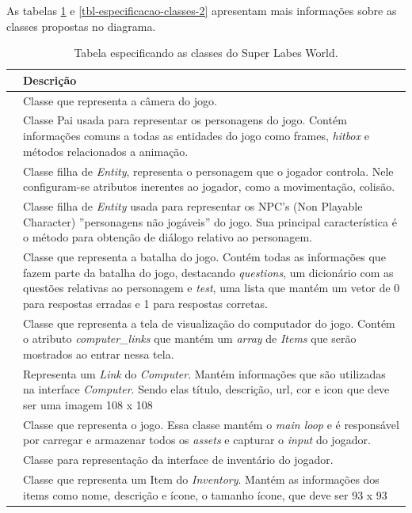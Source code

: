 As tabelas \ref{tbl-especificacao-classes-1} e \ref{tbl-especificacao-classes-2}  apresentam mais informações sobre as classes propostas no diagrama.

\begin{table}[h!]
	\caption{Tabela especificando as classes do Super Labes World.}
	\label{tbl-especificacao-classes-1}
	\centering
	\renewcommand{\arraystretch}{2}
	\begin{small}
		\begin{tabular}{ | p{35mm} | p{100mm} |}\hline \rowcolor{MidnightBlue}
			\centering{\textbf{Classe}} & \textbf{Descrição}  \\\hline		
			\centering{\textit{AllSprites}} & Classe que representa a câmera do jogo. \\\hline
			\centering{\textit{Entity}} & Classe Pai usada para representar os personagens do jogo. Contém informações comuns a todas as entidades do jogo como frames, \textit{hitbox} e métodos relacionados a animação.   \\\hline
			\centering{\textit{Player}} & Classe filha de \textit{Entity}, representa o personagem que o jogador controla. Nele configuram-se atributos inerentes ao jogador, como a movimentação, colisão.  \\\hline
			\centering{\textit{Character}} & Classe filha de \textit{Entity} usada para representar os NPC's (Non Playable Character) ''personagens não jogáveis'' do jogo. Sua principal característica é o método para obtenção de diálogo relativo ao personagem.\\\hline
			\centering{\textit{Battle}} & Classe que representa a batalha do jogo. Contém todas as informações que fazem parte da batalha do jogo, destacando \textit{questions}, um dicionário com as questões relativas ao personagem e \textit{test}, uma lista que mantém um vetor de 0 para respostas erradas e 1 para respostas corretas.\\\hline
			\centering{\textit{Computer}} & Classe que representa a tela de visualização do computador do jogo. Contém o atributo \textit{computer\_links} que mantém um \textit{array} de \textit{Items} que serão mostrados ao entrar nessa tela. \\\hline
			\centering{\textit{Link}} & Representa um \textit{Link} do \textit{Computer}. Mantém informações que são utilizadas na interface \textit{Computer}. Sendo elas título, descrição, url, cor e icon que deve ser uma imagem 108 x 108 \\\hline
			\centering{\textit{Game}} & Classe que representa o jogo. Essa classe  mantém o \textit{main loop} e é responsável por carregar e armazenar todos os \textit{assets} e capturar o \textit{input} do jogador. \\\hline
			\centering{\textit{Inventory}} & Classe para representação da interface de inventário do jogador. \\\hline
			\centering{Item} & Classe que representa um Item do \textit{Inventory}. Mantém as informações dos items como nome, descrição e ícone, o tamanho ícone, que deve ser 93 x 93 \\\hline
		\end{tabular}
	\end{small}
\end{table}


